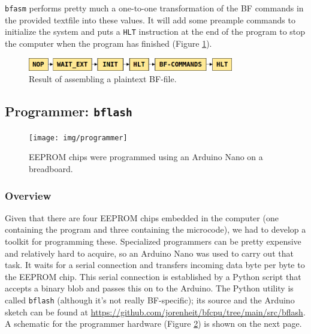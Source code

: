 \texttt{bfasm} performs pretty much a one-to-one transformation of the BF commands in the provided textfile into these values. It will add some preample commands to initialize the system and puts a \texttt{HLT} instruction at the end of the program to stop the computer when the program has finished (Figure \ref{fig:assembleoutput}).

\begin{figure}[H]
  \centering
  \includegraphics[width=0.8\textwidth]{img/assembleroutput}
  \caption{Result of assembling a plaintext BF-file.}
  \label{fig:assembleoutput}
\end{figure}


\subsection{Programmer: \texttt{bflash}} \label{sec:utilities:bflash}

\begin{figure}[H]
  \centering
  \texttt{[image: img/programmer]}
  \caption{EEPROM chips were programmed using an Arduino Nano on a breadboard.}
  \label{fig:programmer}
\end{figure}

\subsubsection{Overview}
Given that there are four EEPROM chips embedded in the computer (one containing the program and three containing the microcode), we had to develop a toolkit for programming these. Specialized programmers can be pretty expensive and relatively hard to acquire, so an Arduino Nano was used to carry out that task. It waits for a serial connection and transfers incoming data byte per byte to the EEPROM chip. This serial connection is established by a Python script that accepts a binary blob and passes this on to the Arduino. The Python utility is called \texttt{bflash} (although it's not really BF-specific); its source and the Arduino sketch can be found at \url{https://github.com/jorenheit/bfcpu/tree/main/src/bflash}. A schematic for the programmer hardware (Figure \ref{fig:programmer}) is shown on the next page.

